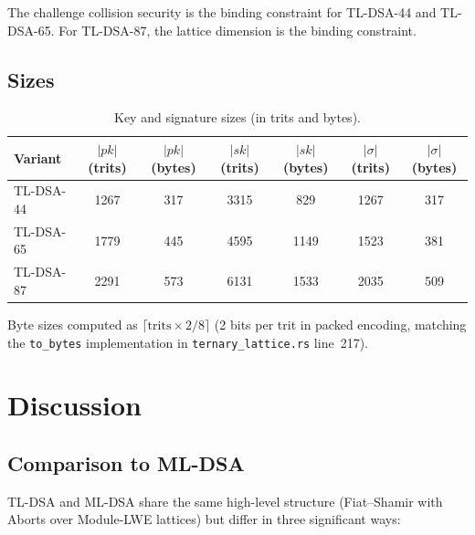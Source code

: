 \documentclass[11pt,a4paper]{article}
\theoremstyle{definition}
\begin{document}
The challenge collision security is the binding constraint for TL-DSA-44 and TL-DSA-65. For TL-DSA-87, the lattice dimension is the binding constraint.

\subsection{Sizes}

\begin{table}[ht]
\centering
\caption{Key and signature sizes (in trits and bytes).}
\label{tab:sizes}
\begin{tabular}{@{}lcccccc@{}}
\toprule
Variant & $|\textit{pk}|$ (trits) & $|\textit{pk}|$ (bytes) & $|\textit{sk}|$ (trits) & $|\textit{sk}|$ (bytes) & $|\sigma|$ (trits) & $|\sigma|$ (bytes) \\
\midrule
TL-DSA-44 & 1267 & 317 & 3315 & 829 & 1267 & 317 \\
TL-DSA-65 & 1779 & 445 & 4595 & 1149 & 1523 & 381 \\
TL-DSA-87 & 2291 & 573 & 6131 & 1533 & 2035 & 509 \\
\bottomrule
\end{tabular}
\end{table}

Byte sizes computed as $\lceil \text{trits} \times 2 / 8 \rceil$ (2 bits per trit in packed encoding, matching the \texttt{to\_bytes} implementation in \texttt{ternary\_lattice.rs} line~217).

\section{Discussion}
\label{sec:discussion}

\subsection{Comparison to ML-DSA}

TL-DSA and ML-DSA share the same high-level structure (Fiat--Shamir with Aborts over Module-LWE lattices) but differ in three significant ways:
\end{document}
